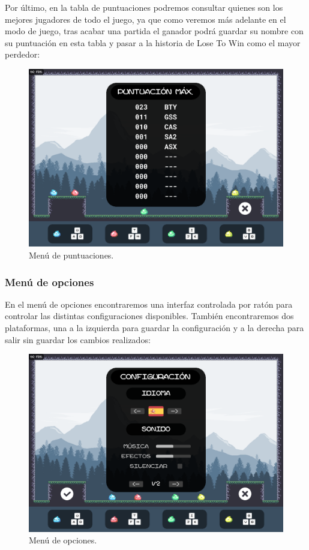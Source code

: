 \documentclass[12pt, spanish]{article}
\begin{document}
Por último, en la tabla de puntuaciones podremos consultar quienes son los mejores jugadores de todo el juego, ya que como veremos más adelante en el modo de juego, tras acabar una partida el ganador podrá guardar su nombre con su puntuación en esta tabla y pasar a la historia de Lose To Win como el mayor perdedor:

\begin{figure}[H]
	\centering
	\includegraphics[width=\textwidth]{"tabla_puntuaciones.png"}
	\caption{Menú de puntuaciones.}\label{figure:tabla_puntuaciones}
\end{figure}


\subsubsection{Menú de opciones}

En el menú de opciones encontraremos una interfaz controlada por ratón para controlar las distintas configuraciones disponibles. También encontraremos dos plataformas, una a la izquierda para guardar la configuración y a la derecha para salir sin guardar los cambios realizados:

\begin{figure}[H]
	\centering
	\includegraphics[width=\textwidth]{"opciones/idiomas/spanish.png"}
	\caption{Menú de opciones.}\label{figure:menu_opciones}
\end{figure}
\end{document}
